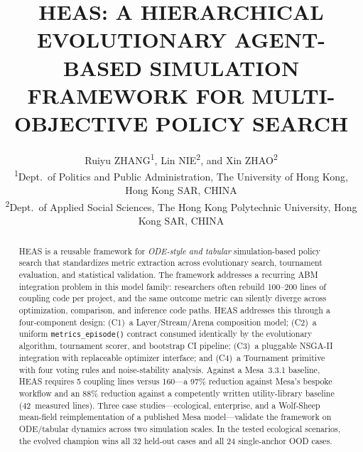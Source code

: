 \documentclass{wscpaperproc}
\begin{document}

\title{HEAS: A HIERARCHICAL EVOLUTIONARY AGENT-BASED SIMULATION FRAMEWORK
       FOR MULTI-OBJECTIVE POLICY SEARCH}

\author{\begin{center}Ruiyu ZHANG\textsuperscript{1}, Lin NIE\textsuperscript{2}, and Xin ZHAO\textsuperscript{2}\\
[11pt]
\textsuperscript{1}Dept.~of Politics and Public Administration, The University of Hong Kong, Hong Kong SAR, CHINA\\
\textsuperscript{2}Dept.~of Applied Social Sciences, The Hong Kong Polytechnic University, Hong Kong SAR, CHINA\end{center}
}

\maketitle

\vspace{-12pt}

\begin{abstract}
HEAS is a reusable framework for \emph{ODE-style and tabular} simulation-based
policy search that standardizes metric extraction across evolutionary search,
tournament evaluation, and statistical validation. The framework addresses a
recurring ABM integration problem in this model family: researchers often rebuild
100--200 lines of coupling code per project, and the same outcome metric can
silently diverge across optimization, comparison, and inference code paths.
HEAS addresses this through a four-component design: (C1)~a
Layer/Stream/Arena composition model; (C2)~a uniform \texttt{metrics\_episode()}
contract consumed identically by the evolutionary algorithm, tournament scorer,
and bootstrap CI pipeline; (C3)~a pluggable NSGA-II integration with replaceable
optimizer interface; and (C4)~a Tournament primitive with four voting rules and
noise-stability analysis. Against a Mesa~3.3.1 baseline, HEAS requires 5
coupling lines versus 160---a 97\% reduction against Mesa's bespoke workflow and
an 88\% reduction against a competently written utility-library baseline
(42~measured lines). Three case studies---ecological, enterprise, and a
Wolf-Sheep mean-field reimplementation of a published Mesa model---validate the
framework on ODE/tabular dynamics across two simulation scales.
In the tested ecological scenarios, the evolved champion wins all 32
held-out cases and all 24 single-anchor OOD cases.
\end{abstract}
\end{document}
